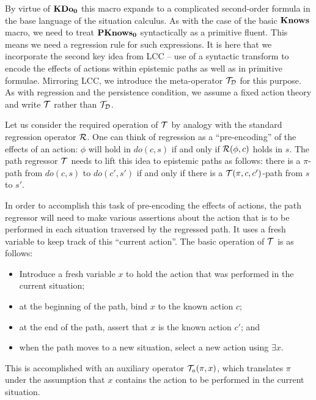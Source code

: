 By virtue of $\mathbf{KDo_{0}}$ this macro expands to a complicated second-order
formula in the base language of the situation calculus. As with the
case of the basic $\mathbf{Knows}$ macro, we need to treat $\mathbf{PKnows_{0}}$ syntactically
as a primitive fluent. This means we need a regression rule for such
expressions. It is here that we incorporate the second key idea from
LCC -- use of a syntactic transform to encode the effects of actions
within epistemic paths as well as in primitive formulae. Mirroring
LCC, we introduce the meta-operator $\mathcal{T}_{\mathcal{D}}$ for this purpose.
As with regression and the persistence condition, we assume a fixed
action theory and write $\mathcal{T}$ rather than $\mathcal{T}_{\mathcal{D}}$.

Let us consider the required operation of $\mathcal{T}$ by analogy with
the standard regression operator $\mathcal{R}$. One can think of regression
as a {}``pre-encoding'' of the effects of an action: $\phi$ will
hold in $do(c,s)$ if and only if $\mathcal{R}(\phi,c)$ holds in $s$. The
path regressor $\mathcal{T}$ needs to lift this idea to epistemic paths
as follows: there is a $\pi$-path from $do(c,s)$ to $do(c',s')$
if and only if there is a $\mathcal{T}(\pi,c,c')$-path from $s$ to $s'$.

In order to accomplish this task of pre-encoding the effects of actions,
the path regressor will need to make various assertions about the
action that is to be performed in each situation traversed by the
regressed path. It uses a fresh variable to keep track of this {}``current
action''. The basic operation of $\mathcal{T}$ is as follows:

\begin{itemize}
\item Introduce a fresh variable $x$ to hold the action that was performed
in the current situation; 
\item at the beginning of the path, bind $x$ to the known action $c$; 
\item at the end of the path, assert that $x$ is the known action $c'$;
and 
\item when the path moves to a new situation, select a new action using
$\exists x$. 
\end{itemize}
This is accomplished with an auxiliary operator $\mathcal{T}_{a}(\pi,x)$, which
translates $\pi$ under the assumption that $x$ contains the action
to be performed in the current situation.

